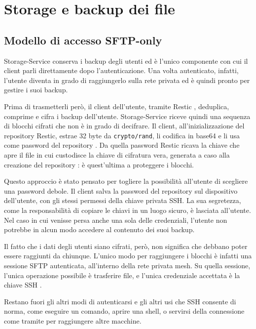 \chapter{Storage e backup dei file}
\label{chap:storage}

\section{Modello di accesso SFTP-only}

Storage-Service conserva i backup degli utenti ed è l'unico componente con cui il client parli
direttamente dopo l'autenticazione. 
Una volta autenticato, infatti, l'utente diventa in grado di raggiungerlo sulla rete privata 
ed è quindi pronto per gestire i suoi backup. 

Prima di trasmetterli però, il client dell'utente, tramite Restic \cite{restic-github}, deduplica, comprime e 
cifra i backup dell'utente. Storage-Service riceve quindi una sequenza di blocchi cifrati che non è 
in grado di decifrare.
Il client, all'inizializzazione del repository Restic, estrae 32 byte da \texttt{crypto/rand}, li
codifica in base64 e li usa come password del repository \cite{ramusb-code-reposecret}. 
Da quella password Restic ricava la chiave che apre il file in cui custodisce la chiave di cifratura vera, 
generata a caso alla creazione del repository \cite{restic-design}: è quest'ultima a proteggere i blocchi.

Questo approccio è stato pensato per togliere la possibilità all'utente di scegliere una password
debole. Il client salva la password del repository sul dispositivo dell'utente, con gli stessi
permessi della chiave privata SSH. La sua segretezza, come la responsabilità di copiare le chiavi in
un luogo sicuro, è lasciata all'utente. Nel caso in cui venisse persa anche una sola delle
credenziali, l'utente non potrebbe in alcun modo accedere al contenuto dei suoi backup.

Il fatto che i dati degli utenti siano cifrati, però, non significa che debbano poter essere raggiunti da 
chiunque.
L'unico modo per raggiungere i blocchi è infatti una sessione SFTP autenticata, all'interno della rete 
privata mesh. Su quella sessione, l'unica operazione possibile è trasferire file, e l'unica credenziale 
accettata è la chiave SSH \cite{openssh-sshd-config}. 

Restano fuori gli altri modi di autenticarsi e gli altri usi che SSH consente di norma, come eseguire un comando, 
aprire una shell, o servirsi della connessione come tramite per raggiungere altre macchine.

